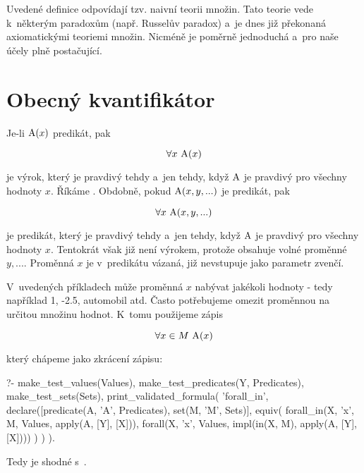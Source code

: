 Uvedené definice odpovídají tzv. naivní teorii množin. Tato teorie vede k~některým paradoxům (např. Russelův paradox) a~je dnes již překonaná axiomatickými teoriemi množin. Nicméně je poměrně jednoduchá a~pro naše účely plně postačující. 

\section{Obecný kvantifikátor}

Je-li \(\mathrm{A}(x)\) predikát, pak

\begin{equation}
\forall x \ \predicate{A}(x)
\end{equation}

je výrok, který je pravdivý tehdy a~jen tehdy, když \(\mathrm{A}\) je pravdivý pro všechny hodnoty \(x\). Říkáme . Obdobně, pokud \(\mathrm{A}(x, y, ...)\) je predikát, pak

\begin{equation}
\forall x \ \mathrm{A}(x, y, ...)
\end{equation}

je predikát, který je pravdivý tehdy a~jen tehdy, když \(\mathrm{A}\) je pravdivý pro všechny hodnoty \(x\). Tentokrát však již není výrokem, protože obsahuje volné proměnné \(y, ...\). Proměnná \(x\) je v~predikátu vázaná, již nevstupuje jako parametr zvenčí.

V~uvedených příkladech může proměnná \(x\) nabývat jakékoli hodnoty - tedy například 1, -2.5, automobil atd. Často potřebujeme omezit proměnnou na určitou množinu hodnot. K~tomu použijeme zápis

\begin{equation}
\forall x \in M \ \predicate{A}(x)
\end{equation}

který chápeme jako zkrácení zápisu:

\begin{prolog}
?- 	make_test_values(Values),
	make_test_predicates(Y, Predicates),
	make_test_sets(Sets),
	print_validated_formula(
		'forall_in',
		declare([predicate(A, 'A', Predicates), set(M, 'M', Sets)],
			equiv(
				forall_in(X, 'x', M, Values, apply(A, [Y], [X])),
				forall(X, 'x', Values, impl(in(X, M), apply(A, [Y], [X])))
			)
		)
	).
\end{prolog}

Tedy  je shodné s~.


